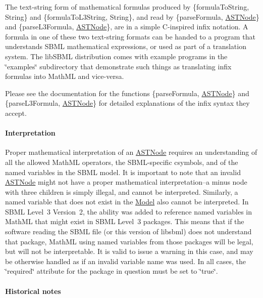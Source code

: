 The text-\/string form of mathematical formulas produced by \{formula\+To\+String, String\} and \{formula\+To\+L3\+String, String\}, and read by \{parse\+Formula, \hyperlink{class_a_s_t_node}{A\+S\+T\+Node}\} and \{parse\+L3\+Formula, \hyperlink{class_a_s_t_node}{A\+S\+T\+Node}\}, are in a simple C-\/inspired infix notation. A formula in one of these two text-\/string formats can be handed to a program that understands S\+B\+ML mathematical expressions, or used as part of a translation system. The lib\+S\+B\+ML distribution comes with example programs in the {\ttfamily \char`\"{}examples\char`\"{}} subdirectory that demonstrate such things as translating infix formulas into Math\+ML and vice-\/versa.

Please see the documentation for the functions \{parse\+Formula, \hyperlink{class_a_s_t_node}{A\+S\+T\+Node}\} and \{parse\+L3\+Formula, \hyperlink{class_a_s_t_node}{A\+S\+T\+Node}\} for detailed explanations of the infix syntax they accept.

\paragraph*{\label{_math-interpretation}%
Interpretation}

Proper mathematical interpretation of an \hyperlink{class_a_s_t_node}{A\+S\+T\+Node} requires an understanding of all the allowed Math\+ML operators, the S\+B\+M\+L-\/specific csymbols, and of the named variables in the S\+B\+ML model. It is important to note that an invalid \hyperlink{class_a_s_t_node}{A\+S\+T\+Node} might not have a proper mathematical interpretation--a \textquotesingle{}minus\textquotesingle{} node with three children is simply illegal, and cannot be interpreted. Similarly, a named variable that does not exist in the \hyperlink{class_model}{Model} also cannot be interpreted. In S\+B\+ML Level~3 Version~2, the ability was added to reference named variables in Math\+ML that might exist in S\+B\+ML Level~3 packages. This means that if the software reading the S\+B\+ML file (or this version of libsbml) does not understand that package, Math\+ML using named variables from those packages will be legal, but will not be interpretable. It is valid to issue a warning in this case, and may be otherwise handled as if an invalid variable name was used. In all cases, the \char`\"{}required\char`\"{} attribute for the package in question must be set to \char`\"{}true\char`\"{}.

\paragraph*{\label{_math-history}%
Historical notes}


